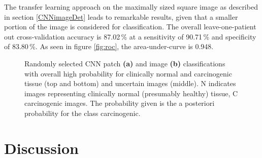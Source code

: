 \documentclass[fleqn,10pt]{wlscirep}
\begin{document}
The transfer learning approach on the maximally sized square image as described in section
\ref{CNNimageDet} leads to remarkable results, given that a smaller portion of the image is considered for classification. The overall leave-one-patient out cross-validation accuracy is 87.02\,\% at a sensitivity of 90.71\,\% and specificity of 83.80\,\%. As seen in figure \ref{fig:roc}, the area-under-curve is 0.948.

\vspace{1em}



\vspace{1em}

\begin{figure}[!t]
\centering
{}
\caption{
Randomly selected CNN patch \textbf{(a)} and image \textbf{(b)} classifications with overall high probability for clinically normal and carcinogenic tissue (top and bottom) and
uncertain images (middle). N indicates images representing clinically normal (presumably healthy) tissue, C carcinogenic
  images. The probability given is the a posteriori probability for
  the class carcinogenic.
}


\end{figure}







\section{Discussion}
\end{document}
